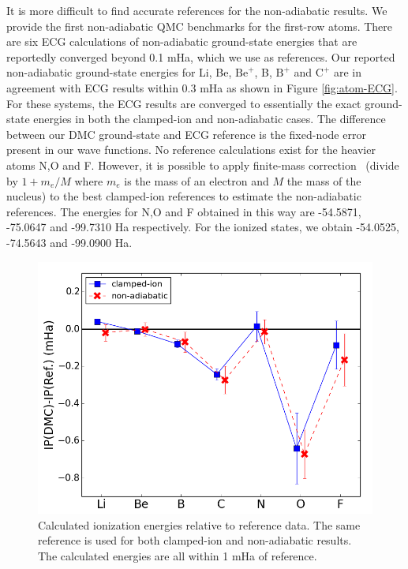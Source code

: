 \documentclass[pra,superscriptaddress,groupedaddress,twocolumn]{revtex4}
\begin{document}
It is more difficult to find accurate references for the non-adiabatic results. We provide the first non-adiabatic QMC benchmarks for the first-row atoms. There are six ECG calculations of non-adiabatic ground-state energies that are reportedly converged beyond 0.1 mHa, which we use as references. Our reported non-adiabatic ground-state energies for Li, Be, $\text{Be}^+$, B, $\text{B}^+$ and $\text{C}^+$ are in agreement with ECG results within 0.3 mHa as shown in Figure \ref{fig:atom-ECG}. For these systems, the ECG results are converged to essentially the exact ground-state energies in both the clamped-ion and non-adiabatic cases. The difference between our DMC ground-state and ECG reference is the fixed-node error present in our wave functions. No reference calculations exist for the heavier atoms N,O and F. However, it is possible to apply finite-mass correction~\cite{Davidson_Atoms,Cencek_LiH} (divide by $1+m_e/M$ where $m_e$ is the mass of an electron and $M$ the mass of the nucleus) to the best clamped-ion references to estimate the non-adiabatic references. The energies for N,O and F obtained in this way are -54.5871, -75.0647 and -99.7310 Ha respectively. For the ionized states, we obtain -54.0525, -74.5643 and -99.0900 Ha. %

\begin{figure}[h]
\centering
\includegraphics[scale=.4]{Figures/ionization}
\caption{Calculated ionization energies relative to reference data. The same reference is used for both clamped-ion and non-adiabatic results. The calculated energies are all within 1 mHa of reference. \label{fig:ionization}}
\end{figure}
\end{document}
